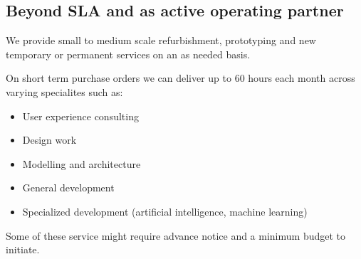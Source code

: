 \subsection{Beyond SLA and as active operating partner}
We provide small to medium scale refurbishment, prototyping and new temporary or permanent services on an as needed basis.

On short term purchase orders we can deliver up to 60 hours each month across varying specialites such as:

\begin{itemize}
\item User experience consulting
\item Design work
\item Modelling and architecture
\item General development
\item Specialized development (artificial intelligence, machine learning)
\end{itemize}

Some of these service might require advance notice and a minimum budget to initiate.
